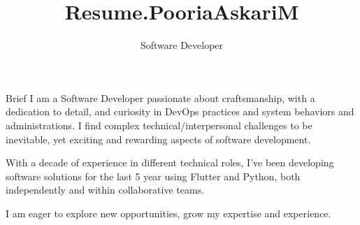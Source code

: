 \documentclass[
	a4paper, %
	12pt, %
]{resume} %
\title{Resume.PooriaAskariM}
\subtitle{Software Developer}  %
\begin{document}
\raggedright
\setlength{\headheight}{42pt} %
\setlength{\footskip}{10pt}  %



\begin{rSection}{Brief}
\bigskip
I am a Software Developer passionate about craftsmanship, with a dedication to detail, and curiosity in DevOps practices and system behaviors and administrations. I find complex technical/interpersonal challenges to be inevitable, yet exciting and rewarding aspects of software development.

With a decade of experience in different technical roles, I've been developing software solutions for the last 5 year using Flutter and Python, both independently and within collaborative teams.

I am eager to explore new opportunities, grow my expertise and experience.
\bigskip


\end{rSection}

\end{document}
